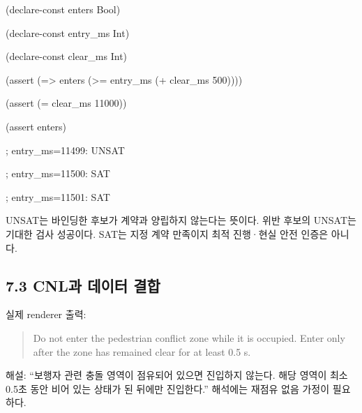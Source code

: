 \documentclass[11pt,a4paper]{article}
\begin{document}
\begingroup\small\ttfamily\setlength{\parskip}{1pt}
\noindent\hspace*{0.0em}(declare-const enters Bool)\par
\noindent\hspace*{0.0em}(declare-const entry\_\allowbreak{}ms Int)\par
\noindent\hspace*{0.0em}(declare-const clear\_\allowbreak{}ms Int)\par
\noindent\hspace*{0.0em}(assert (=> enters (>= entry\_\allowbreak{}ms (+ clear\_\allowbreak{}ms 500))))\par
\noindent\hspace*{0.0em}(assert (= clear\_\allowbreak{}ms 11000))\par
\noindent\hspace*{0.0em}(assert enters)\par
\noindent\hspace*{0.0em}; entry\_\allowbreak{}ms=11499: UNSAT\par
\noindent\hspace*{0.0em}; entry\_\allowbreak{}ms=11500: SAT\par
\noindent\hspace*{0.0em}; entry\_\allowbreak{}ms=11501: SAT\par\endgroup\par

UNSAT는 바인딩한 후보가 계약과 양립하지 않는다는 뜻이다. 위반 후보의 UNSAT는 기대한 검사 성공이다. SAT는 지정 계약 만족이지 최적 진행·현실 안전 인증은 아니다.\par

\clearpage\subsection*{7.3 CNL과 데이터 결합}

실제 renderer 출력:\par

\begin{quote}Do not enter the pedestrian conflict zone while it is occupied. Enter only after the zone has remained clear for at least 0.5 s.\end{quote}

해설: “보행자 관련 충돌 영역이 점유되어 있으면 진입하지 않는다. 해당 영역이 최소 0.5초 동안 비어 있는 상태가 된 뒤에만 진입한다.” 해석에는 재점유 없음 가정이 필요하다.\par
\end{document}
